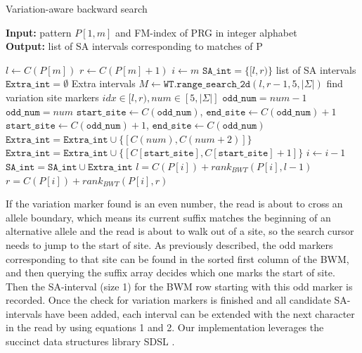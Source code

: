 \documentclass[runningheads,a4paper]{llncs}
\begin{document}
\begin{algorithm}
\caption{Variation-aware backward search} \label{bsearch}
\textbf{Input:} \textrm{pattern} $P[1,m]$ \textrm{and FM-index of PRG in integer alphabet}\\
\textbf{Output:} \textrm{list of SA intervals corresponding to matches of P} 
\begin{algorithmic}[1]
\State $l \gets C(P[m])$
\State $r \gets C(P[m]+1)$
\State $i \gets m$
\State $\texttt{SA\char`_int}=\{[l,r)\}$ \Comment list of SA intervals
\State $\texttt{Extra\char`_int}=\emptyset$   \Comment Extra intervals
\ForAll {$[l,r) \in \texttt{SA\char`_int}$} 
\State $M \gets \texttt{WT.range\char`_search\char`_2d} (l,r-1,5,|\Sigma|)$ \Comment find variation site markers
  \Comment $ idx\in [l,r), num\in[5,|\Sigma|]$
\State $\texttt{odd\char`_num}=num-1$
\Else
\State $\texttt{odd\char`_num}=num$
\EndIf
{}
\State $\texttt{start\char`_site} \gets C(\texttt{odd\char`_num})$, $\texttt{end\char`_site} \gets C(\texttt{odd\char`_num})+1$
\Else 
\State $\texttt{start\char`_site} \gets C(\texttt{odd\char`_num})+1$, $\texttt{end\char`_site} \gets C(\texttt{odd\char`_num})$
\EndIf
{}
\State $\texttt{Extra\char`_int}=\texttt{Extra\char`_int} \cup \{[C(num),C(num+2)]\}$
\Else
\State $\texttt{Extra\char`_int}=\texttt{Extra\char`_int} \cup \{[C[\texttt{start\char`_site}], C[\texttt{start\char`_site}]+1]\}$
\EndIf
\EndFor
\EndFor
\State $i \gets i-1$
\State $\texttt{SA\char`_int}=\texttt{SA\char`_int} \cup \texttt{Extra\char`_int}$
\ForAll {$[l,r) \in \texttt{SA\char`_int}$} 
\State $l=C(P[i])+rank_{BWT}(P[i],l-1)$
\State $r=C(P[i])+rank_{BWT}(P[i],r)$
\EndFor
\EndWhile
\end {algorithmic}
\end{algorithm}

If the variation marker found is an even number, the read is about to cross an allele boundary, which means its current suffix matches the beginning of an alternative allele and the read is about to walk out of a site, so the search cursor needs to jump to the start of site. As previously described, the odd markers corresponding to that site can be found in the sorted first column of the BWM, and then querying the suffix array decides which one marks the start of site. Then the SA-interval (size 1) for the BWM row starting with this odd marker is recorded.
Once the check for variation markers is finished and all candidate SA-intervals have been added, each interval can be extended with the next character in the read by using equations 1 and 2. Our implementation leverages the succinct data structures library SDSL \cite{gog}.
\end{document}
